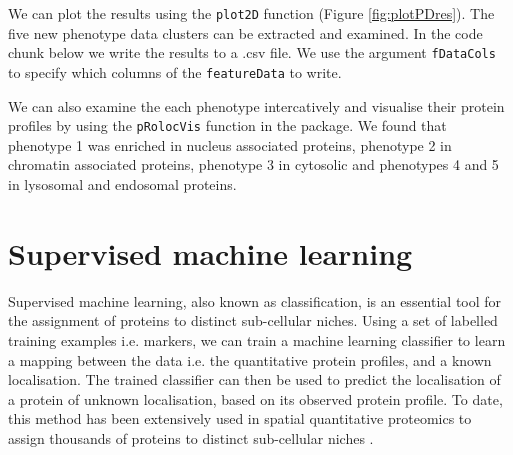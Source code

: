 We can plot the results using the \texttt{plot2D} function (Figure
\ref{fig:plotPDres}). The five new phenotype data clusters can be
extracted and examined.  In the code chunk below we write the results
to a .csv file. We use the argument \texttt{fDataCols} to specify
which columns of the \texttt{featureData} to write.

\begin{knitrout}
\color{fgcolor}\begin{kframe}
\begin{alltt}
\hlopt{$} \hlkwb{<-} \hlstd{(}\hlopt{$}
  \hlstd{=} \hlstd{,}  \hlstd{=} \hlstd{,}  \hlstd{=} \hlstd{)}
\end{alltt}
\end{kframe}
\end{knitrout}

We can also examine the each phenotype intercatively and visualise
their protein profiles by using the \texttt{pRolocVis} function in the
 package. We found that phenotype 1 was
enriched in nucleus associated proteins, phenotype 2 in chromatin
associated proteins, phenotype 3 in cytosolic and phenotypes 4 and 5
in lysosomal and endosomal proteins.


\section*{Supervised machine learning}

Supervised machine learning, also known as classification, is an
essential tool for the assignment of proteins to distinct sub-cellular
niches. Using a set of labelled training examples i.e. markers, we can
train a machine learning classifier to learn a mapping between the
data i.e. the quantitative protein profiles, and a known localisation.
The trained classifier can then be used to predict the localisation of
a protein of unknown localisation, based on its observed protein
profile. To date, this method has been extensively used in spatial
quantitative proteomics to assign thousands of proteins to distinct
sub-cellular niches
\cite{hyper,Groen:2014,Trotter:2010,Hall:2009,Dunkley:2006,Tan:2009}.

